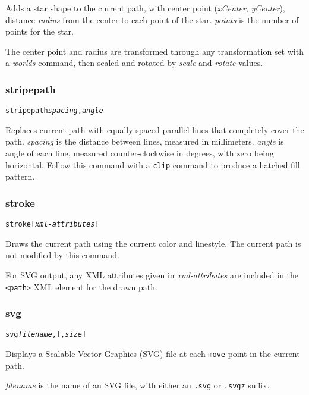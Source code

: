 Adds a star shape to the current path, with center
point (\textit{xCenter}, \textit{yCenter}), distance
\textit{radius}
from the center to each point of the star.
\textit{points} is the number of points for the star.

The center point and radius are transformed through any
transformation set with a \textit{worlds} command,
then scaled and rotated by \textit{scale}
and \textit{rotate} values.

\subsubsection{stripepath}

\begin{alltt}
stripepath \textit{spacing}, \textit{angle}
\end{alltt}

Replaces current path with equally spaced parallel lines that completely cover
the path.  \textit{spacing} is the distance between lines, measured in
millimeters.  \textit{angle} is angle of each line, measured
counter-clockwise in degrees, with zero being horizontal.  Follow this command
with a \texttt{clip} command to produce a hatched fill pattern.

\subsubsection{stroke}

\begin{alltt}
stroke [\textit{xml-attributes}]
\end{alltt}

Draws the current path using the current color and linestyle.
The current path is not modified by this command.

For SVG output, any XML attributes given in
\textit{xml-attributes} are
included in the \texttt{<path>} XML element for the drawn path.

\subsubsection{svg}

\begin{alltt}
svg \textit{filename}, [, \textit{size}]
\end{alltt}

Displays a Scalable Vector Graphics (SVG) file at each \texttt{move} point in
the current path.  

\textit{filename} is the name of an SVG file, with 
either an \texttt{.svg} or \texttt{.svgz} suffix.

